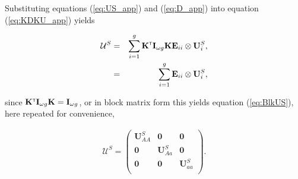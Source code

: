 \documentclass[11pt]{article}
\def\mbf#1{\mathbf{#1}}
\def\mcal#1{\mathcal{#1}}
\newcommand{\bo}[1]{{\bf #1}}
\newcommand{\tr}{{\mbox{\tiny \sf T}}}
\begin{document}
Substituting equations (\ref{eq:US_app}) and (\ref{eq:D_app}) into equation (\ref{eq:KDKU_app}) yields
\begin{linenomath*}
\begin{eqnarray}
\mcal{U}^S &=& \sum_{i=1}^g \bo K^\tr \bo I_{\omega g}	 \bo K \mathbf{E}_{ii} \otimes \mathbf{U}^S_{i}, \\
 &=& \sum_{i=1}^g \mathbf{E}_{ii} \otimes \mathbf{U}^S_{i},
\end{eqnarray}
\end{linenomath*}
since $\bo K^\tr \bo I_{\omega g}	 \bo K=\bo I_{\omega g}$, or in block matrix form this yields equation (\ref{eq:BlkUS}), here repeated for convenience, 
\begin{linenomath*}
\begin{eqnarray}
\mcal{U}^S  = 
		\left(
			\begin{array}{ccc}
				\mbf{U}^{S}_{AA} & \mbf{0} & \mbf{0} \\
				\mbf{0} & \mbf{U}^{S}_{Aa} & \mbf{0} \\
				\mbf{0} & \mbf{0} & \mbf{U}^{S}_{aa} \\
			\end{array} \right).\label{eq:BlkUS}\\
\end{eqnarray}
\end{linenomath*}
\end{document}
